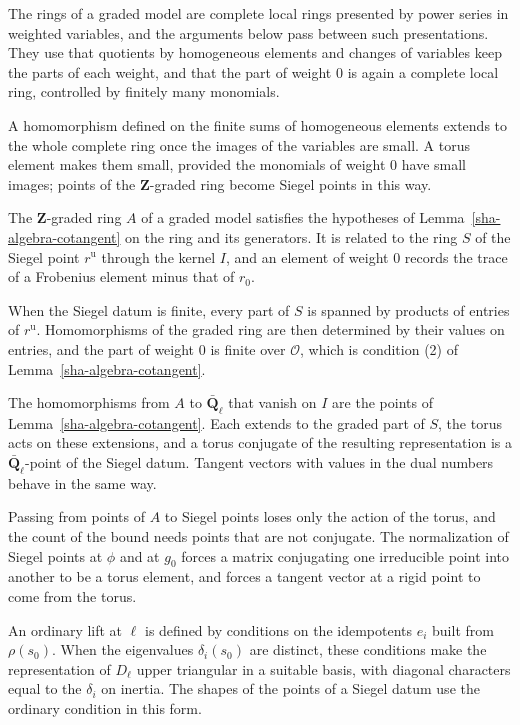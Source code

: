 The rings of a graded model are complete local rings presented by power series in weighted variables, and the arguments below pass between such presentations. They use that quotients by homogeneous elements and changes of variables keep the parts of each weight, and that the part of weight $0$ is again a complete local ring, controlled by finitely many monomials.

A homomorphism defined on the finite sums of homogeneous elements extends to the whole complete ring once the images of the variables are small. A torus element makes them small, provided the monomials of weight $0$ have small images; points of the $\mathbf Z$-graded ring become Siegel points in this way.

The $\mathbf Z$-graded ring $A$ of a graded model satisfies the hypotheses of Lemma~\ref{sha-algebra-cotangent} on the ring and its generators. It is related to the ring $S$ of the Siegel point $r^{\mathrm u}$ through the kernel $I$, and an element of weight $0$ records the trace of a Frobenius element minus that of $r_0$.

When the Siegel datum is finite, every part of $S$ is spanned by products of entries of $r^{\mathrm u}$. Homomorphisms of the graded ring are then determined by their values on entries, and the part of weight $0$ is finite over $\mathcal O$, which is condition (2) of Lemma~\ref{sha-algebra-cotangent}.

The homomorphisms from $A$ to $\bar{\mathbf Q}_\ell$ that vanish on $I$ are the points of Lemma~\ref{sha-algebra-cotangent}. Each extends to the graded part of $S$, the torus acts on these extensions, and a torus conjugate of the resulting representation is a $\bar{\mathbf Q}_\ell$-point of the Siegel datum. Tangent vectors with values in the dual numbers behave in the same way.

Passing from points of $A$ to Siegel points loses only the action of the torus, and the count of the bound needs points that are not conjugate. The normalization of Siegel points at $\phi$ and at $g_0$ forces a matrix conjugating one irreducible point into another to be a torus element, and forces a tangent vector at a rigid point to come from the torus.

An ordinary lift at $\ell$ is defined by conditions on the idempotents $e_i$ built from $\rho(s_0)$. When the eigenvalues $\delta_i(s_0)$ are distinct, these conditions make the representation of $D_\ell$ upper triangular in a suitable basis, with diagonal characters equal to the $\delta_i$ on inertia. The shapes of the points of a Siegel datum use the ordinary condition in this form.

